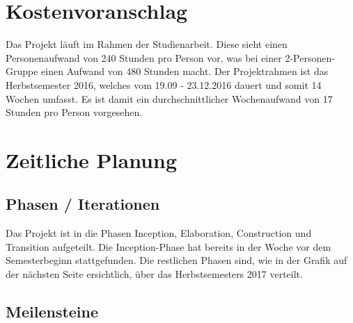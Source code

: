 
 \section{Kostenvoranschlag}
 Das Projekt läuft im Rahmen der Studienarbeit. Diese sieht einen Personenaufwand von 240 Stunden pro Person vor, was bei einer 2-Personen-Gruppe einen Aufwand von 480 Stunden macht. 
 Der Projektrahmen ist das Herbstsemester 2016, welches vom 19.09 - 23.12.2016 dauert und somit 14 Wochen umfasst. Es ist damit ein durchschnittlicher Wochenaufwand von 17 Stunden pro Person vorgesehen.
 
 
 \section{Zeitliche Planung}
 
 \subsection{Phasen / Iterationen}
 Das Projekt ist in die Phasen Inception, Elaboration, Construction und Transition aufgeteilt. Die Inception-Phase hat bereits in der Woche vor dem Semesterbeginn stattgefunden. Die restlichen Phasen sind, wie in der Grafik auf der nächsten Seite ersichtlich, über das Herbstsemesters 2017 verteilt.
 
 
 
 \subsection{Meilensteine}
 
 
